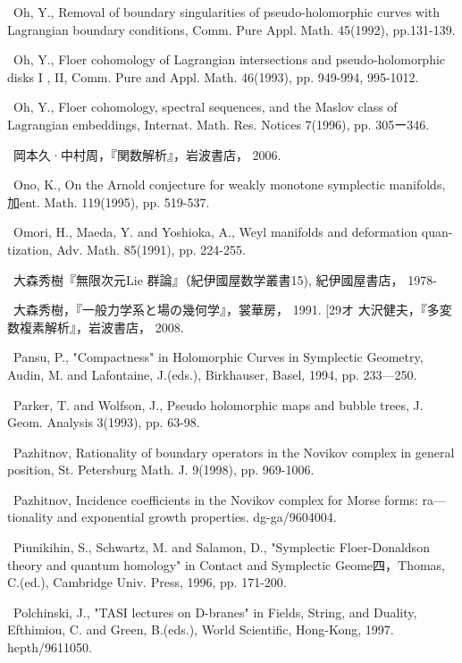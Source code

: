 {\noindent [289]\ Oh, Y., Removal of boundary singularities of pseudo-holomorphic curves with Lagrangian boundary conditions, Comm. Pure Appl. Math. 45(1992), pp.131-139.\par\smallskip
\noindent [290]\ Oh, Y., Floer cohomology of Lagrangian intersections and pseudo-holomorphic disks I , II, Comm. Pure and Appl. Math. 46(1993), pp. 949-994, 995-1012.\par\smallskip
\noindent [291]\ Oh, Y., Floer cohomology, spectral sequences, and the Maslov class of Lagrangian embeddings, Internat. Math. Res. Notices 7(1996), pp. 305ー346.\par\smallskip
\noindent [292]\ 岡本久·中村周，『関数解析』，岩波書店， 2006.\par\smallskip
\noindent [293]\ Ono, K., On the Arnold conjecture for weakly monotone symplectic manifolds, 加ent. Math. 119(1995), pp. 519-537.\par\smallskip
\noindent [294]\ Omori, H., Maeda, Y. and Yoshioka, A., Weyl manifolds and deformation quan-tization, Adv. Math. 85(1991), pp. 224-255.\par\smallskip
\noindent [295]\ 大森秀樹『無限次元Lie 群論』（紀伊國屋数学叢書15), 紀伊國屋書店， 1978-\par\smallskip
\noindent [296]\ 大森秀樹，『一般力学系と場の幾何学』，裳華房， 1991. [29オ 大沢健夫，『多変数複素解析』，岩波書店， 2008.\par\smallskip
\noindent [298]\ Pansu, P., "Compactness" in Holomorphic Curves in Symplectic Geometry, Audin, M. and Lafontaine, J.(eds.), Birkhauser, Basel, 1994, pp. 233—250.\par\smallskip
\noindent [299]\ Parker, T. and Wolfson, J., Pseudo holomorphic maps and bubble trees, J. Geom. Analysis 3(1993), pp. 63-98.\par\smallskip
\noindent [300]\ Pazhitnov, Rationality of boundary operators in the Novikov complex in general position, St. Petersburg Math. J. 9(1998), pp. 969-1006.\par\smallskip
\noindent [301]\ Pazhitnov, Incidence coefficients in the Novikov complex for Morse forms: ra— tionality and exponential growth properties. dg-ga/9604004.\par\smallskip
\noindent [302]\ Piunikihin, S., Schwartz, M. and Salamon, D., "Symplectic Floer-Donaldson theory and quantum homology" in Contact and Symplectic Geome四，Thomas, C.(ed.), Cambridge Univ. Press, 1996, pp. 171-200.\par\smallskip
\noindent [303]\ Polchinski, J., "TASI lectures on D-branes" in Fields, String, and Duality, Efthimiou, C. and Green, B.(eds.), World Scientific, Hong-Kong, 1997. hepth/9611050.\par\smallskip
}
